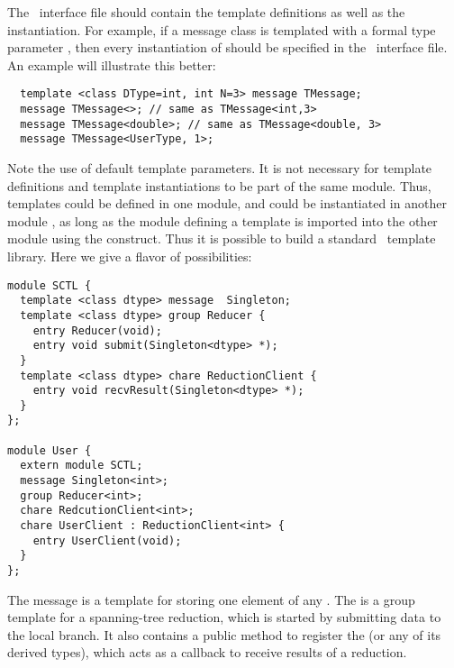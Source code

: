 The \charmpp\ interface file should contain the template
definitions as well as the instantiation. For example, if a message
class  is templated with a formal type parameter 
, then every instantiation of  should be specified
in the \charmpp\ interface file. An example will illustrate this better:

\begin{verbatim}
  template <class DType=int, int N=3> message TMessage;
  message TMessage<>; // same as TMessage<int,3>
  message TMessage<double>; // same as TMessage<double, 3>
  message TMessage<UserType, 1>;
\end{verbatim}

Note the use of default template parameters. It is not necessary for
template definitions and template instantiations to be part of the
same module.  Thus, templates could be defined in one module, and
could be instantiated in another module , as long as the
module defining a template is imported into the other module using the
 construct. Thus it is possible to build a standard
\charmpp\ template library. Here we give a flavor of possibilities:

\begin{verbatim}
module SCTL {
  template <class dtype> message  Singleton;
  template <class dtype> group Reducer {
    entry Reducer(void);
    entry void submit(Singleton<dtype> *);
  }
  template <class dtype> chare ReductionClient {
    entry void recvResult(Singleton<dtype> *);
  }
};

module User {
  extern module SCTL;
  message Singleton<int>;
  group Reducer<int>;
  chare RedcutionClient<int>;
  chare UserClient : ReductionClient<int> {
    entry UserClient(void);
  }
};
\end{verbatim}

The  message is a template for storing one element of
any . The  is a group template for a
spanning-tree reduction, which is started by submitting data to the
local branch. It also contains a public method to register the
 (or any of its derived types), which acts as a
callback to receive results of a reduction.
